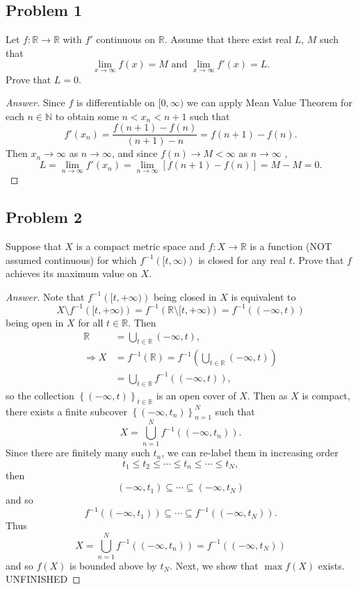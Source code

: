 \documentclass[12pt]{article}
\newcommand{\n}{\mathbb{N}}
\newcommand{\real}{\mathbb{R}}
\newcommand\inv[1]{#1^{-1}}
\newcommand\paren[1]{\left( #1 \right)}
\newcommand\setb[1]{\left \{ #1 \right \}}
\newcommand{\sqbrack}[1]{\left [ #1 \right ]}
\theoremstyle{definition}
\begin{document}
\subsection{Problem 1 \texorpdfstring{\cite{Joel}}{}}
Let $f: \real \to \real$ with $f'$ continuous on $\real$. Assume that there exist real $L$, $M$ such that 
\[
    \lim\limits_{x \to \infty} f(x) = M \text{ and } \lim\limits_{x \to \infty} f'(x) = L . 
\] 
Prove that $L = 0$.
\begin{proof}[Answer]
    Since $f$ is differentiable on $[0,\infty)$ we can apply Mean Value Theorem for each $n \in \n$ to obtain some $n < x_n < n+1$ such that 
    \[
        f'(x_n) = \frac{f(n+1) - f(n)}{(n+1) - n} = f(n+1) - f(n) . 
    \]
    Then $x_n \to \infty$ as $n \to \infty$, and since $f(n) \to M < \infty$ as $n \to \infty$ , 
    \[
        L = \lim\limits_{n \to \infty} f'(x_n) = \lim\limits_{n \to \infty} \sqbrack{ f(n+1) - f(n) } = M - M = \boxed{ 0 . }
    \]
\end{proof}

\subsection{Problem 2}
Suppose that $X$ is a compact metric space and $f : X \to \real$ is a function (NOT assumed continuous) for which $\inv{f} \paren{ [t,\infty) }$ is closed for any real $t$. Prove that $f$ achieves its maximum value on $X$.
\begin{proof}[Answer]
    Note that $\inv{f} \paren{ [t,+\infty) }$ being closed in $X$ is equivalent to 
    \[
        X \setminus \inv{f} \paren{ [t,+\infty) } = \inv{f} \paren{ \real \setminus [t,+\infty) } = \inv{f} \paren{ (-\infty,t) }
    \]
    being open in $X$ for all $t \in \real$. Then 
    \begin{align*}
        \real & = \bigcup\limits_{t \in \real} (-\infty,t) , \\ \Rightarrow X & = \inv{f}(\real) = \inv{f} \paren{ \bigcup\limits_{t \in \real} (-\infty,t) } \\ 
        & = \bigcup\limits_{t \in \real} \inv{f} \paren{ (-\infty,t) } , 
    \end{align*}
    so the collection $\setb{ (-\infty,t) }_{t \in \real}$ is an open cover of $X$. Then as $X$ is compact, there exists a finite subcover $\setb{ { \paren{ -\infty, t_n } } }_{n = 1}^{N}$ such that 
    \[
        X = \bigcup\limits_{n = 1}^N \inv{f} \paren{ \paren{ -\infty,t_n } } . 
    \]
    Since there are finitely many such $t_n$, we can re-label them in increasing order 
    \[
        t_1 \leq t_2 \leq \dotsb \leq t_n \leq \dotsb \leq t_N , 
    \]
    then 
    \[
        \paren{ -\infty , t_1 } \subseteq \dotsb \subseteq \paren{ -\infty , t_N }
    \]
    and so 
    \[
        \inv{f} \paren{ \paren{ -\infty , t_1 } } \subseteq \dotsb \subseteq \inv{f} \paren{ \paren{ -\infty , t_N } } . 
    \]
    Thus 
    \[
        X = \bigcup\limits_{n = 1}^N \inv{f} \paren{ \paren{ -\infty,t_n } } = \inv{f} \paren{ \paren{ -\infty , t_N } }
    \]
    and so $f(X)$ is bounded above by $t_N$. Next, we show that $\max f(X)$ exists. UNFINISHED
\end{proof}
\end{document}
